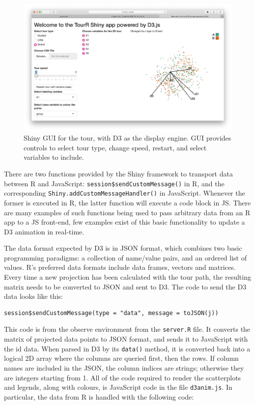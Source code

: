 \begin{figure}[ht]
\centerline{\includegraphics[width=15cm]{figures/TourrD3.png}}
\caption{Shiny GUI for the tour, with D3 as the display engine. GUI provides controls to select tour type, change speed, restart, and select variables to include.}
\label{tourrD3}
\end{figure}

There are two functions provided by the Shiny framework to transport
data between R and JavaScript: \texttt{session\$sendCustomMessage()} in
R, and the corresponding \texttt{Shiny.addCustomMessageHandler()} in
JavaScript. Whenever the former is executed in R, the latter function
will execute a code block in JS. There are many examples of such
functions being used to pass arbitrary data from an R app to a JS
front-end, few examples exist of this basic functionality to update a D3
animation in real-time.

The data format expected by D3 is in JSON format, which combines two
basic programming paradigms: a collection of name/value pairs, and an
ordered list of values. R's preferred data formats include data frames,
vectors and matrices. Every time a new projection has been calculated
with the tour path, the resulting matrix needs to be converted to JSON
and sent to D3. The code to send the D3 data looks like this:

\begin{verbatim}
session$sendCustomMessage(type = "data", message = toJSON(j))
\end{verbatim}

This code is from the observe environment from the \texttt{server.R}
file. It converts the matrix of projected data points to JSON format,
and sends it to JavaScript with the id data. When parsed in D3 by its
\texttt{data()} method, it is converted back into a logical 2D array
where the columns are queried first, then the rows. If column names are
included in the JSON, the column indices are strings; otherwise they are
integers starting from 1. All of the code required to render the
scatterplots and legends, along with colours, is JavaScript code in the
file \texttt{d3anim.js}. In particular, the data from R is handled with
the following code:

